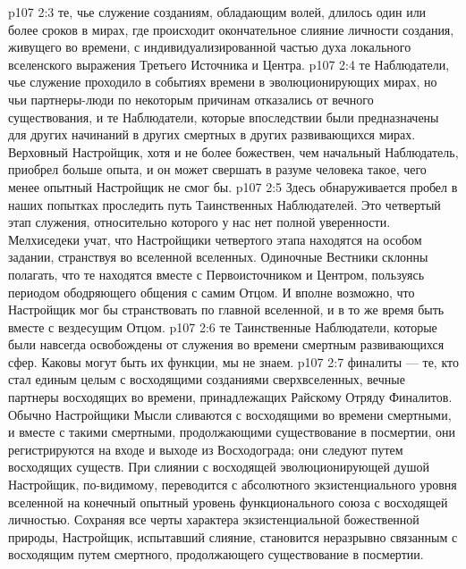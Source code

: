 \vs p107 2:3 \bibnobreakspace {} те, чье служение созданиям, обладающим волей, длилось один или более сроков в мирах, где происходит окончательное слияние личности создания, живущего во времени, с индивидуализированной частью духа локального вселенского выражения Третьего Источника и Центра.
\vs p107 2:4 \bibnobreakspace {} те Наблюдатели, чье служение проходило в событиях времени в эволюционирующих мирах, но чьи партнеры\hyp{}люди по некоторым причинам отказались от вечного существования, и те Наблюдатели, которые впоследствии были предназначены для других начинаний в других смертных в других развивающихся мирах. Верховный Настройщик, хотя и не более божествен, чем начальный Наблюдатель, приобрел больше опыта, и он может свершать в разуме человека такое, чего менее опытный Настройщик не смог бы.
\vs p107 2:5 \bibnobreakspace {} Здесь обнаруживается пробел в наших попытках проследить путь Таинственных Наблюдателей. Это четвертый этап служения, относительно которого у нас нет полной уверенности. Мелхиседеки учат, что Настройщики четвертого этапа находятся на особом задании, странствуя во вселенной вселенных. Одиночные Вестники склонны полагать, что те находятся вместе с Первоисточником и Центром, пользуясь периодом ободряющего общения с самим Отцом. И вполне возможно, что Настройщик мог бы странствовать по главной вселенной, и в то же время быть вместе с вездесущим Отцом.
\vs p107 2:6 \bibnobreakspace {} те Таинственные Наблюдатели, которые были навсегда освобождены от служения во времени смертным развивающихся сфер. Каковы могут быть их функции, мы не знаем.
\vs p107 2:7 \bibnobreakspace {} финалиты --- те, кто стал единым целым с восходящими созданиями сверхвселенных, вечные партнеры восходящих во времени, принадлежащих Райскому Отряду Финалитов. Обычно Настройщики Мысли сливаются с восходящими во времени смертными, и вместе с такими смертными, продолжающими существование в посмертии, они регистрируются на входе и выходе из Восходограда; они следуют путем восходящих существ. При слиянии с восходящей эволюционирующей душой Настройщик, по\hyp{}видимому, переводится с абсолютного экзистенциального уровня вселенной на конечный опытный уровень функционального союза с восходящей личностью. Сохраняя все черты характера экзистенциальной божественной природы, Настройщик, испытавший слияние, становится неразрывно связанным с восходящим путем смертного, продолжающего существование в посмертии.
